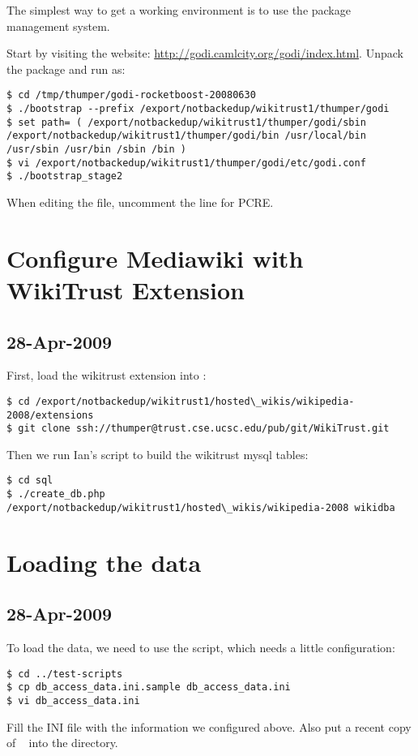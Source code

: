 The simplest way to get a working  environment is
to use the  package management system.

Start by visiting the website:
\url{http://godi.camlcity.org/godi/index.html}.
Unpack the  package and run as:
\begin{verbatim}
$ cd /tmp/thumper/godi-rocketboost-20080630
$ ./bootstrap --prefix /export/notbackedup/wikitrust1/thumper/godi
$ set path= ( /export/notbackedup/wikitrust1/thumper/godi/sbin /export/notbackedup/wikitrust1/thumper/godi/bin /usr/local/bin /usr/sbin /usr/bin /sbin /bin )
$ vi /export/notbackedup/wikitrust1/thumper/godi/etc/godi.conf
$ ./bootstrap_stage2
\end{verbatim}
When editing the  file, uncomment the line
for PCRE.


\section{Configure Mediawiki with WikiTrust Extension}

\subsection{28-Apr-2009}

First, load the wikitrust extension into \mediawiki:
\begin{verbatim}
$ cd /export/notbackedup/wikitrust1/hosted\_wikis/wikipedia-2008/extensions
$ git clone ssh://thumper@trust.cse.ucsc.edu/pub/git/WikiTrust.git
\end{verbatim}

Then we run Ian's script to build the wikitrust mysql tables:
\begin{verbatim}
$ cd sql
$ ./create_db.php /export/notbackedup/wikitrust1/hosted\_wikis/wikipedia-2008 wikidba
\end{verbatim}

\section{Loading the data}

\subsection{28-Apr-2009}

To load the data, we need to use the  script,
which needs a little configuration:
\begin{verbatim}
$ cd ../test-scripts
$ cp db_access_data.ini.sample db_access_data.ini
$ vi db_access_data.ini
\end{verbatim}
Fill the INI file with the information we configured above.
Also put a recent copy of ~\cite{mwdumper}
into the directory.


